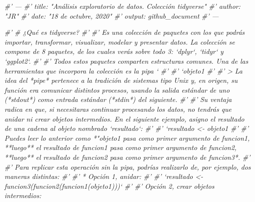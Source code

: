 \documentclass[11pt,]{article}
\newenvironment{Shaded}{\begin{snugshade}}{\end{snugshade}}
\newcommand{\CommentTok}[1]{\textcolor[rgb]{0.56,0.35,0.01}{\textit{#1}}}
\begin{document}
\begin{Shaded}
\begin{Highlighting}[]
\CommentTok{#' ---}
\CommentTok{#' title: "Análisis exploratorio de datos. Colección tidyverse"}
\CommentTok{#' author: "JR"}
\CommentTok{#' date: "18 de octubre, 2020"}
\CommentTok{#' output: github_document}
\CommentTok{#' ---}

\CommentTok{#' # ¿Qué es tidyverse?}
\CommentTok{#' }
\CommentTok{#' Es una colección de paquetes con los que podrás importar, transformar, visualizar, modelar y presentar datos. La colección se compone de 8 paquetes, de los cuales verás sobre todo 3: `dplyr`, `tidyr` y `ggplot2`.}
\CommentTok{#' }
\CommentTok{#' Todos estos paquetes comparten estructuras comunes. Una de las herramientas que incorpora la colección es la pipa `%
\CommentTok{#' }
\CommentTok{#' `objeto1 %
\CommentTok{#' }
\CommentTok{#' > La idea del *pipe* pertenece a la tradición de sistemas tipo Unix y, en origen, su función era comunicar distintos procesos, usando la salida estándar de uno (*stdout*) como entrada estándar (*stdin*) del siguiente.}
\CommentTok{#' }
\CommentTok{#' Su ventaja radica en que, si necesitaras continuar procesando los datos, no tendrás que anidar ni crear objetos intermedios. En el siguiente ejemplo, asigno el resultado de una cadena al objeto nombrado `resultado`:}
\CommentTok{#' }
\CommentTok{#' `resultado <- objeto1 %
\CommentTok{#' }
\CommentTok{#' Puedes leer lo anterior como *"objeto1 pasa como primer argumento de funcion1, **luego** el resultado de funcion1 pasa como primer argumento de funcion2, **luego** el resultado de funcion2 pasa como primer argumento de funcion3*.}
\CommentTok{#' }
\CommentTok{#' Para replicar esta operación sin la pipa, podrías realizarlo de, por ejemplo, dos maneras distintas:}
\CommentTok{#' }
\CommentTok{#' * Opción 1, anidar:}
\CommentTok{#' }
\CommentTok{#' `resultado <- funcion3(funcion2(funcion1(objeto1)))`}
\CommentTok{#' }
\CommentTok{#' Opción 2, crear objetos intermedios:}
}}}
\end{Highlighting}
\end{Shaded}
\end{document}
